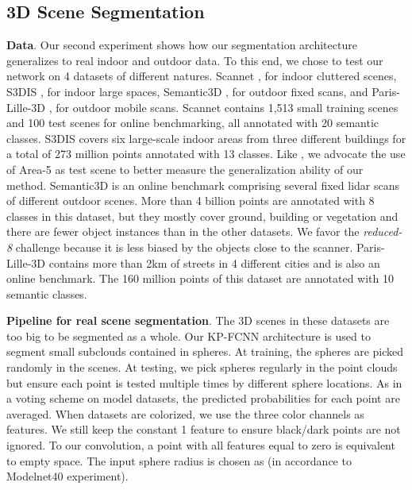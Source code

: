 \documentclass[10pt,twocolumn,letterpaper]{article}
\begin{document}
\subsection{3D Scene Segmentation}
\label{section_42}

\noindent
\textbf{Data}. Our second experiment shows how our segmentation architecture generalizes to real indoor and outdoor data. To this end, we chose to test our network on 4 datasets of different natures. Scannet \cite{dai2017scannet}, for indoor cluttered scenes, S3DIS \cite{armeni20163d}, for indoor large spaces, Semantic3D \cite{hackel2017semantic3d}, for outdoor fixed scans, and Paris-Lille-3D \cite{roynard2018paris}, for outdoor mobile scans. Scannet contains 1,513 small training scenes and 100 test scenes for online benchmarking, all annotated with 20 semantic classes. S3DIS covers six large-scale indoor areas from three different buildings for a total of 273 million points annotated with 13 classes. Like \cite{tchapmi2017segcloud}, we advocate the use of Area-5 as test scene to better measure the generalization ability of our method. Semantic3D is an online benchmark comprising several fixed lidar scans of different outdoor scenes. More than 4 billion points are annotated with 8 classes in this dataset, but they mostly cover ground, building or vegetation and there are fewer object instances than in the other datasets. We favor the \textit{reduced-8} challenge because it is less biased by the objects close to the scanner. Paris-Lille-3D contains more than 2km of streets in 4 different cities and is also an online benchmark. The 160 million points of this dataset are annotated with 10 semantic classes.



\noindent
\textbf{Pipeline for real scene segmentation}. The 3D scenes in these datasets are too big to be segmented as a whole. Our KP-FCNN architecture is used to segment small subclouds contained in spheres. At training, the spheres are picked randomly in the scenes. At testing, we pick spheres regularly in the point clouds but ensure each point is tested multiple times by different sphere locations. As in a voting scheme on model datasets, the predicted probabilities for each point are averaged. When datasets are colorized, we use the three color channels as features. We still keep the constant 1 feature to ensure black/dark points are not ignored. To our convolution, a point with all features equal to zero is equivalent to empty space. The input sphere radius is chosen as  (in accordance to Modelnet40 experiment).
\end{document}
